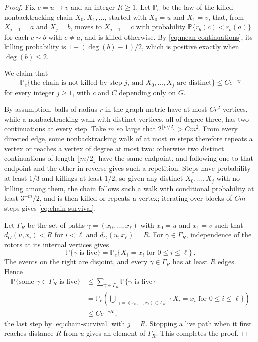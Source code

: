 \documentclass[11pt]{amsart}
\theoremstyle{plain}
\theoremstyle{definition}
\renewcommand{\P}{\mathbb P}
\begin{document}
	\begin{proof}
		Fix $e=u\to v$ and an integer $R\geq1$.
		Let $\P_e$ be the law of the killed nonbacktracking chain
		$X_0,X_1,\ldots$, started with $X_0=u$ and $X_1=v$, that, from
		$X_{j-1}=a$ and $X_j=b$, moves to $X_{j+1}=c$ with probability
		$\P\{r_b(c)<r_b(a)\}$ for each $c\sim b$ with $c\ne a$, and is killed
		otherwise.  By \eqref{eq:mean-continuations}, its killing probability is
		$1-(\deg(b)-1)/2$, which is positive exactly when $\deg(b)\leq2$.

		We claim that
		\begin{equation}\label{eq:chain-survival}
			\P_e\{\text{the chain is not killed by step $j$,
			and $X_0,\ldots,X_j$ are distinct}\}
			\leq Ce^{-cj}
		\end{equation}
		for every integer $j\geq1$, with $c$ and $C$ depending only on $G$.
		
		By assumption, balls of radius $r$ in the graph metric have at most $Cr^2$
		vertices, while a nonbacktracking walk with distinct vertices, all of degree
		three, has two continuations at every step.  Take $m$ so large that
		$2^{\lfloor m/2\rfloor}>Cm^2$.  From every directed edge, some
		nonbacktracking walk of at most $m$ steps therefore repeats a vertex or reaches
		a vertex of degree at most two: otherwise two distinct continuations of length
		$\lfloor m/2\rfloor$ have the same endpoint, and following one to that endpoint
		and the other in reverse gives such a repetition.  Steps
		have probability at least $1/3$ and killings at least $1/2$, so given any
		distinct $X_0,\ldots,X_j$ with no killing among them, the chain follows such
		a walk with conditional probability at least
		$3^{-m}/2$, and is then killed or repeats a vertex;
		iterating over blocks of $C m$ steps gives \eqref{eq:chain-survival}.
		
		Let $\Gamma_R$ be the set of paths $\gamma=(x_0,\ldots,x_\ell)$ with $x_0=u$
		and $x_1=v$ such that $d_G(u,x_i)<R$ for $i<\ell$ and $d_G(u,x_\ell)=R$. For $\gamma\in\Gamma_R$, independence of
		the rotors at its internal vertices gives
		\[
		\P\{\gamma\text{ is live}\}
		=\P_e\{X_i=x_i\text{ for }0\leq i\leq\ell\}\, .
		\]
		The events on the right are disjoint, and every $\gamma\in\Gamma_R$ has at
		least $R$ edges.  Hence
		\begin{align*}
			\P\{\text{some $\gamma\in\Gamma_R$ is live}\}
			&\leq \sum_{\gamma\in\Gamma_R}\P\{\gamma\text{ is live}\}\\
			&=\P_e\left(\bigcup_{\substack{\gamma=(x_0,\ldots,x_\ell)\in\Gamma_R}}
			\{X_i=x_i\text{ for }0\leq i\leq\ell\}\right)\\
			&\leq Ce^{-cR}\, ,
		\end{align*}
		the last step by \eqref{eq:chain-survival} with $j=R$.
		Stopping a live path when it first reaches distance $R$ from $u$ gives an
		element of $\Gamma_R$. This completes the proof. 
	\end{proof}
	
\end{document}
